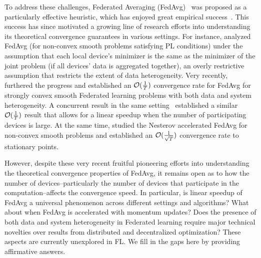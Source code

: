 To address these challenges, Federated Averaging (FedAvg)~\cite{mcmahan2016communication} was proposed as a particularly effective heuristic, which has enjoyed great empirical success~\cite{47586}. This success has since motivated a growing line of research efforts into understanding its theoretical convergence guarantees in various settings. For instance, \cite{haddadpour2019convergence} analyzed FedAvg (for non-convex smooth problems satisfying PL conditions) under the assumption that each local device's minimizer is the same as the minimizer of the joint problem (if all devices' data is aggregated together), an overly restrictive assumption that restricts the extent of data heterogeneity.
Very recently, \cite{li2019convergence} furthered the progress and established an ${\mathcal{O}}(\frac{1}{T})$ convergence rate for FedAvg for strongly convex smooth Federated learning problems with both data and system heterogeneity. A concurrent result in the same setting~\cite{karimireddy2019scaffold} established a similar ${\mathcal{O}}(\frac{1}{T})$ result that allows for a linear speedup when the number of participating devices is large.
At the same time, \cite{huo2020faster} studied the Nesterov accelerated FedAvg for non-convex smooth problems and established 
an ${\mathcal{O}}(\frac{1}{\sqrt{T}})$ convergence rate to stationary points. 


However, despite these very recent fruitful pioneering efforts into understanding the theoretical convergence properties of FedAvg, it remains open as to how the number of devices--particularly the number of devices that participate in the computation--affects the convergence speed.
In particular, is linear speedup of FedAvg a universal phenomenon across different settings and algorithms? What about when FedAvg is accelerated with momentum updates? Does the presence of both data and system heterogeneity in Federated learning require major technical novelties over results from distributed and decentralized optimization? These aspects are currently unexplored in FL. We fill in the gaps here by providing affirmative answers.

